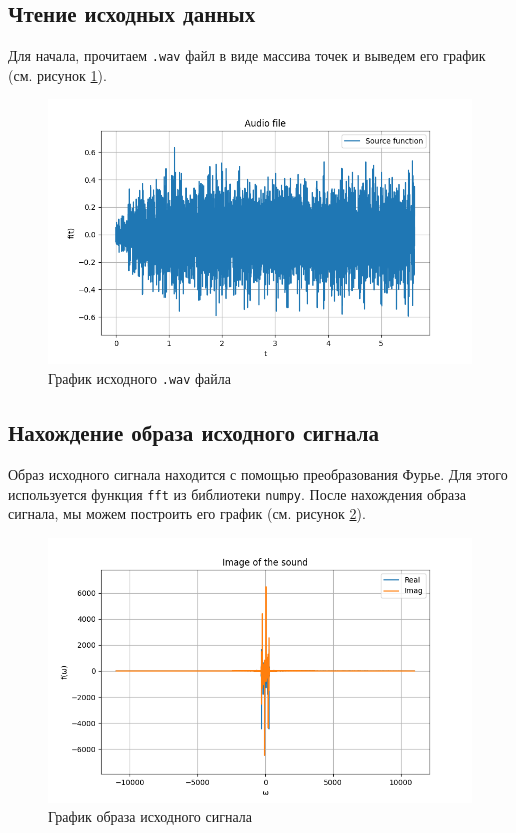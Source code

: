 \subsection{Чтение исходных данных}

Для начала, прочитаем \texttt{.wav} файл в виде массива точек и выведем его график (см. рисунок \ref{fig:source_wavwform}).

\begin{figure}
    \centering
    \includegraphics[width=\textwidth]{../results/Source waveform.png}
    \caption{График исходного \texttt{.wav} файла}
    \label{fig:source_wavwform}
\end{figure}

\subsection{Нахождение образа исходного сигнала}

Образ исходного сигнала находится с помощью преобразования Фурье. Для этого используется функция \texttt{fft} из библиотеки \texttt{numpy}. После нахождения образа сигнала, мы можем построить его график (см. рисунок \ref{fig:image}).

\begin{figure}
    \centering
    \includegraphics[width=\textwidth]{../results/image.png}
    \caption{График образа исходного сигнала}
    \label{fig:image}
\end{figure}

